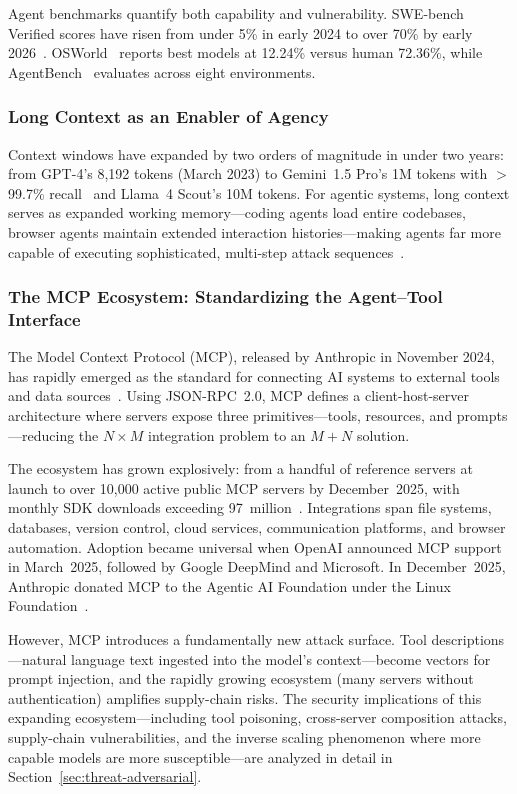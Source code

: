 Agent benchmarks quantify both capability and vulnerability. SWE-bench Verified scores have risen from under 5\% in early 2024 to over 70\% by early 2026~\cite{jimenez2024swebench}. OSWorld~\cite{xie2024osworld} reports best models at 12.24\% versus human 72.36\%, while AgentBench~\cite{liu2024agentbench} evaluates across eight environments.


\subsubsection{Long Context as an Enabler of Agency}
\label{sec:cap-context}

Context windows have expanded by two orders of magnitude in under two years: from GPT-4's 8,192 tokens (March 2023) to Gemini~1.5 Pro's 1M tokens with $>$99.7\% recall~\cite{gemini15} and Llama~4 Scout's 10M tokens. For agentic systems, long context serves as expanded working memory---coding agents load entire codebases, browser agents maintain extended interaction histories---making agents far more capable of executing sophisticated, multi-step attack sequences~\cite{anthropic2024effective}.


\subsubsection{The MCP Ecosystem: Standardizing the Agent--Tool Interface}
\label{sec:cap-mcp}

The Model Context Protocol (MCP), released by Anthropic in November 2024, has rapidly emerged as the standard for connecting AI systems to external tools and data sources~\cite{anthropic2024mcp}. Using JSON-RPC~2.0, MCP defines a client-host-server architecture where servers expose three primitives---tools, resources, and prompts---reducing the $N \times M$ integration problem to an $M+N$ solution.

The ecosystem has grown explosively: from a handful of reference servers at launch to over 10,000 active public MCP servers by December~2025, with monthly SDK downloads exceeding 97~million~\cite{mcp2025anniversary}. Integrations span file systems, databases, version control, cloud services, communication platforms, and browser automation. Adoption became universal when OpenAI announced MCP support in March~2025, followed by Google DeepMind and Microsoft. In December~2025, Anthropic donated MCP to the Agentic AI Foundation under the Linux Foundation~\cite{anthropic2025aaif}.

However, MCP introduces a fundamentally new attack surface. Tool descriptions---natural language text ingested into the model's context---become vectors for prompt injection, and the rapidly growing ecosystem (many servers without authentication) amplifies supply-chain risks. The security implications of this expanding ecosystem---including tool poisoning, cross-server composition attacks, supply-chain vulnerabilities, and the inverse scaling phenomenon where more capable models are more susceptible---are analyzed in detail in Section~\ref{sec:threat-adversarial}.


